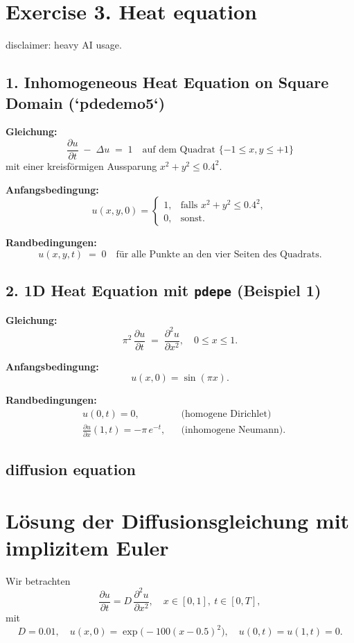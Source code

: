 \documentclass{scrartcl}
\begin{document}
\section*{Exercise 3. Heat equation}
disclaimer: heavy AI usage.
\subsection*{1. Inhomogeneous Heat Equation on Square Domain (`pdedemo5`)}

\textbf{Gleichung:}
\[
\frac{\partial u}{\partial t} \;-\;\Delta u \;=\;1
\quad\text{auf dem Quadrat } \{-1 \le x,y \le +1\}
\]
mit einer kreisförmigen Aussparung \(x^2+y^2 \le 0.4^2\).

\medskip
\textbf{Anfangsbedingung:}
\[
u(x,y,0) =
\begin{cases}
1, & \text{falls }x^2+y^2 \le 0.4^2,\\
0, & \text{sonst.}
\end{cases}
\]

\medskip
\textbf{Randbedingungen:}
\[
u(x,y,t) \;=\; 0
\quad\text{für alle Punkte an den vier Seiten des Quadrats.}
\]

\bigskip
\subsection*{2. 1D Heat Equation mit \texttt{pdepe} (Beispiel 1)}

\textbf{Gleichung:}
\[
\pi^2 \,\frac{\partial u}{\partial t}
\;=\;
\frac{\partial^2 u}{\partial x^2},
\quad 0 \le x \le 1.
\]

\medskip
\textbf{Anfangsbedingung:}
\[
u(x,0) = \sin(\pi x).
\]

\medskip
\textbf{Randbedingungen:}
\[
\begin{aligned}
&u(0,t) = 0,               &&\text{(homogene Dirichlet)}\\
&\frac{\partial u}{\partial x}(1,t)
  = -\pi\,e^{-t},          &&\text{(inhomogene Neumann)}.
\end{aligned}
\]
\subsection*{diffusion equation}
\section*{Lösung der Diffusionsgleichung mit implizitem Euler}

Wir betrachten
\[
\frac{\partial u}{\partial t}
= D\,\frac{\partial^2 u}{\partial x^2},
\quad x\in[0,1],\ t\in[0,T],
\]
mit
\[
D = 0.01,\quad
u(x,0) = \exp\bigl(-100(x-0.5)^2\bigr),\quad
u(0,t)=u(1,t)=0.
\]
\end{document}
